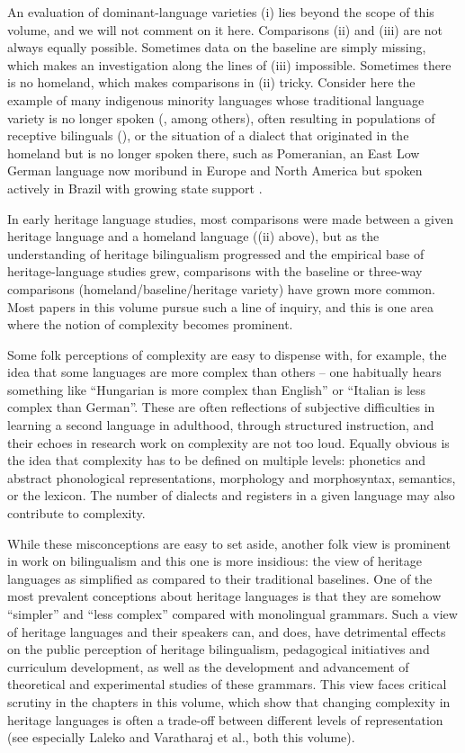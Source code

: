 \documentclass[output=paper,colorlinks,citecolor=brown]{langscibook}
\begin{document}
An evaluation of dominant-language varieties (i) lies beyond the scope of this volume, and we will not comment on it here. Comparisons (ii) and (iii) are not always equally possible. Sometimes data on the baseline are simply missing, which makes an investigation along the lines of (iii) impossible. Sometimes there is no homeland, which makes comparisons in (ii) tricky. Consider here the example of many indigenous minority languages whose traditional language variety is no longer spoken (\cites{GrenobleOsipov2023}{Kehayov2017}[Ch. 1]{Polinsky2018}{Sasse1992}, among others), often resulting in populations of receptive bilinguals (\citealt{HolmesPutnam2020,Sherkina-Lieber2015}), or the situation of a dialect that originated in the homeland but is no longer spoken there, such as Pomeranian, an East Low German language now moribund in Europe and North America but spoken actively in Brazil with growing state support \citep{Savedra2020}.

In early heritage language studies, most comparisons were made between a given heritage language and a homeland language ((ii) above), but as the understanding of heritage bilingualism progressed and the empirical base of heritage-language studies grew, comparisons with the baseline or three-way comparisons (homeland/baseline/heritage variety) have grown more common. Most papers in this volume pursue such a line of inquiry, and this is one area where the notion of complexity becomes prominent. 

Some folk perceptions of complexity are easy to dispense with, for example, the idea that some languages are more complex than others -- one habitually hears something like “Hungarian is more complex than English” or “Italian is less complex than German”. These are often reflections of subjective difficulties in learning a second language in adulthood, through structured instruction, and their echoes in research work on complexity are not too loud. Equally obvious is the idea that complexity has to be defined on multiple levels: phonetics and abstract phonological representations, morphology and morphosyntax, semantics, or the lexicon. The number of dialects and registers in a given language may also contribute to complexity. 

While these misconceptions are easy to set aside, another folk view is prominent in work on bilingualism and this one is more insidious: the view of heritage languages as simplified as compared to their traditional baselines. One of the most prevalent conceptions about heritage languages is that they are somehow “simpler” and “less complex” compared with monolingual grammars. Such a view of heritage languages and their speakers can, and does, have detrimental effects on the public perception of heritage bilingualism, pedagogical initiatives and curriculum development, as well as the development and advancement of theoretical and experimental studies of these grammars. This view faces critical scrutiny in the chapters in this volume, which show that changing complexity in heritage languages is often a trade-off between different levels of representation (see especially Laleko and Varatharaj et al., both this volume). 
\end{document}
